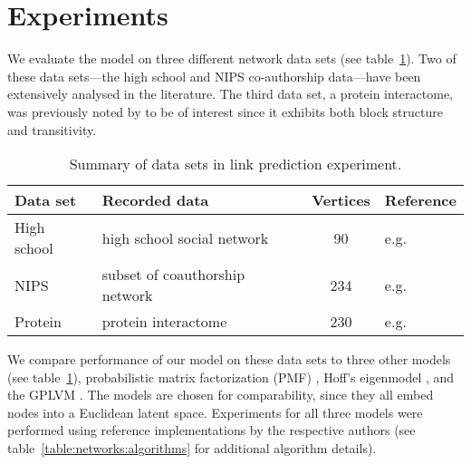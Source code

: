 
\section{Experiments}
\label{sec:experiments}
We evaluate the model on three different network data sets (see table~\ref{table:networks:datasets}). Two of these data sets---the high school and NIPS co-authorship data---have been extensively
analysed in the literature.
The third data set, a protein interactome, was previously noted by \citet{Hoff2007-ja} to be of interest since it exhibits both block structure and transitivity.

\begin{table}
\begin{center}
  \begin{tabular}{l  l  c  l}
    Data set & Recorded data & Vertices & Reference\\
    \midrule
    High school & high school social network & 90 & e.g.\ \cite{Hoff2007-ja} \\
    NIPS & subset of coauthorship network & 234 & e.g.\ \cite{Miller2009-wg} \\
    Protein & protein interactome & 230 & e.g.\ \cite{Hoff2007-ja}
  \end{tabular}
\end{center}
  \caption[Summary of data sets in link prediction experiment.]{Summary of data sets in link prediction experiment.}
  \label{table:networks:datasets}
\end{table}

We compare performance of our model on these data sets to three other models (see table~\ref{table:networks:datasets}), probabilistic matrix factorization (PMF) \citep{Salakhutdinov2008-tp},
Hoff's eigenmodel \citep{Hoff2007-ja}, and the GPLVM \citep{Lawrence2005-cn}. The models are chosen for comparability, since they all embed nodes into a Euclidean latent space.
Experiments for all three models were performed using reference implementations by the respective 
authors (see table~\ref{table:networks:algorithms} for additional algorithm details).\footnotemark


